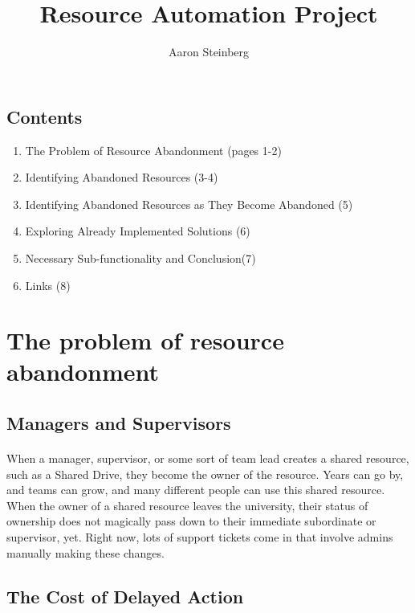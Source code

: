\documentclass{article}
\author{Aaron Steinberg}
\title{Resource Automation Project}
\begin{document}
\maketitle

\begin{tcolorbox}
    \section*{Contents}
    \begin{enumerate}
        \item The Problem of Resource Abandonment (pages 1-2)
        \item Identifying Abandoned Resources (3-4)
        \item Identifying Abandoned Resources as They Become Abandoned (5)
        \item Exploring Already Implemented Solutions (6)
        \item Necessary Sub-functionality and Conclusion(7)
        \item Links (8)
    \end{enumerate}
\end{tcolorbox}

\newpage
\section{The problem of resource abandonment}
\subsection*{Managers and Supervisors}
\paragraph*{} When a manager, supervisor, or some sort of team lead creates a shared resource, such as a Shared Drive,
they become the owner of the resource. Years can go by, and teams can grow, and many different people can use this shared resource.
When the owner of a shared resource leaves the university, their status of ownership does not magically pass down to their immediate subordinate or supervisor, yet.
Right now, lots of support tickets come in that involve admins manually making these changes.

\subsection*{The Cost of Delayed Action}
\end{document}
